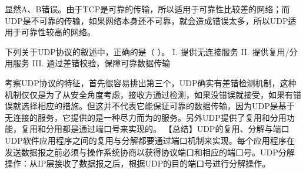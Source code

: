 \begin{solution}显然A、B错误。由于TCP是可靠的传输，所以适用于可靠性比较差的网络；而UDP是不可靠的传输，如果网络本身还不可靠，就会造成错误太多，所以UDP适用于可靠性较高的网络。
\end{solution}
\question 下列关于UDP协议的叙述中，正确的是（ ）。 I. 提供无连接服务 II.
提供复用/分用服务 III. 通过差错校验，保障可靠数据传输
\par{}
\begin{solution}考察UDP协议的特征，首先很容易排出第三个，UDP确实有差错检测机制，这种机制仅仅是为了从安全角度考虑，接收方通过检测，如果没错误就接受，如果有错误就选择相应的措施。但这并不代表它能保证可靠的数据传输，因为UDP是基于无连接的服务，它提供的是一种尽力而为的服务。另外UDP提供了复用和分用功能，复用和分用都是通过端口号来实现的。
【总结】UDP的复用、分解与端口UDP软件应用程序之间的复用与分解都要通过端口机制来实现。每个应用程序在发送数据报之前必须与操作系统协商以获得协议端口和相应的端口号。UDP分解操作：从IP层接收了数据报之后，根据UDP的目的端口号进行分解操作。
\end{solution}
